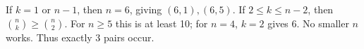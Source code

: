 If $k=1$ or $n-1$, then $n=6$, giving $(6,1),(6,5)$. If $2\le k\le n-2$, then $\binom nk\ge\binom n2$. For $n\ge5$ this is at least 10; for $n=4$, $k=2$ gives 6. No smaller $n$ works. Thus exactly $\boxed3$ pairs occur.
